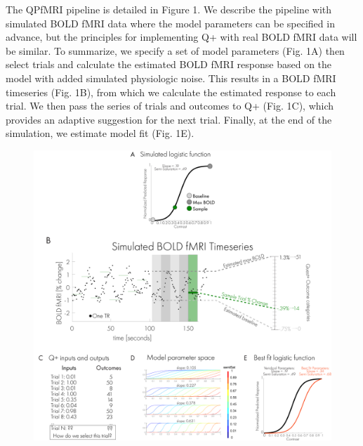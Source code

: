 \documentclass[
  man,floatsintext]{apa6}
\begin{document}
The QPfMRI pipeline is detailed in Figure 1. We describe the pipeline with simulated BOLD fMRI data where the model parameters can be specified in advance, but the principles for implementing Q+ with real BOLD fMRI data will be similar. To summarize, we specify a set of model parameters (Fig. 1A) then select trials and calculate the estimated BOLD fMRI response based on the model with added simulated physiologic noise. This results in a BOLD fMRI timeseries (Fig. 1B), from which we calculate the estimated response to each trial. We then pass the series of trials and outcomes to Q+ (Fig. 1C), which provides an adaptive suggestion for the next trial. Finally, at the end of the simulation, we estimate model fit (Fig. 1E).

\newpage
\begin{figure}

{\centering \includegraphics[width=650px]{figures/Figure1} 

}


\end{figure}
\end{document}
